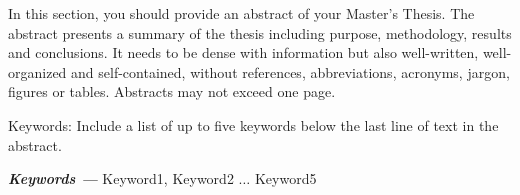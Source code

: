 \label{sec:abstract}

In this section, you should provide an abstract of your Master's Thesis.  The abstract presents a summary of the thesis including purpose, methodology, results and conclusions. It needs to be dense with information but also well-written, well-organized and self-contained, without references, abbreviations, acronyms, jargon, figures or tables. Abstracts may not exceed one page.

Keywords: Include a list of up to five keywords below the last line of text in the abstract. 

{\vspace{5mm}\textbf{\textit{Keywords ---}} Keyword1, Keyword2 $\ldots$ Keyword5} 